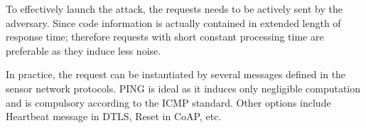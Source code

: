 To effectively launch the attack, the requests needs to be actively sent by the adversary. Since code information is actually contained in extended  length of response time; therefore requests with short constant processing time are preferable as they induce less noise. 

In practice, the request can be instantiated by several messages defined in the sensor network protocols. PING is ideal as it induces only negligible computation and is compulsory according to the ICMP standard\cite{rfc4433}. Other options include Heartbeat message in DTLS\cite{rfc6520}, Reset in CoAP\cite{rfc7252}, etc.

